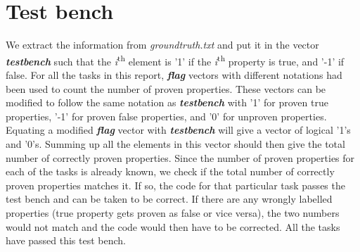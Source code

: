 \documentclass[11pt]{article}
\begin{document}
\section{Test bench}
\label{sec:testbench}
We extract the information from \emph{groundtruth.txt} and put it in the vector \textbf{\emph{testbench}} such that the \emph{i}\textsuperscript{th} element is '1' if the \emph{i}\textsuperscript{th} property is true, and '-1' if false. For all the tasks in this report, \textbf{\emph{flag}} vectors with different notations had been used to count the number of proven properties. These vectors can be modified to follow the same notation as \textbf{\emph{testbench}} with '1' for proven true properties, '-1' for proven false properties, and '0' for unproven properties. Equating a modified \textbf{\emph{flag}} vector with \textbf{\emph{testbench}} will give a vector of logical '1's and '0's. Summing up all the elements in this vector should then give the total number of correctly proven properties. Since the number of proven properties for each of the tasks is already known, we check if the total number of correctly proven properties matches it. If so, the code for that particular task passes the test bench and can be taken to be correct. If there are any wrongly labelled properties (true property gets proven as false or vice versa), the two numbers would not match and the code would then have to be corrected. All the tasks have passed this test bench.
\end{document}
